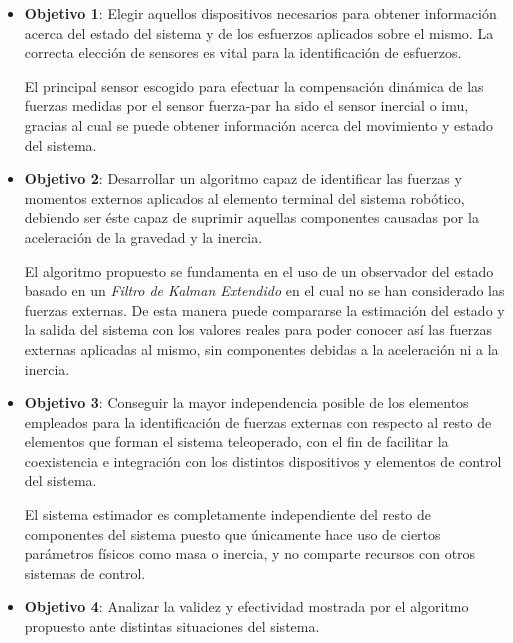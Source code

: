 \begin{itemize}

\item \textbf{Objetivo 1}: Elegir aquellos dispositivos necesarios para obtener información acerca del estado del sistema y de los esfuerzos aplicados sobre el mismo. La correcta elección de sensores es vital para la identificación de esfuerzos. \par 

El principal sensor escogido para efectuar la compensación dinámica de las fuerzas medidas por el sensor fuerza-par ha sido el sensor inercial o \acrshort{imu}, gracias al cual se puede obtener información acerca del movimiento y estado del sistema. \par 

\item \textbf{Objetivo 2}: Desarrollar un algoritmo capaz de identificar las fuerzas y momentos externos aplicados al elemento terminal del sistema robótico, debiendo ser éste capaz de suprimir aquellas componentes causadas por la aceleración de la gravedad y la inercia. \par 

El algoritmo propuesto se fundamenta en el uso de un observador del estado basado en un \emph{Filtro de Kalman Extendido} en el cual no se han considerado las fuerzas externas. De esta manera puede compararse la estimación del estado y la salida del sistema con los valores reales para poder conocer así las fuerzas externas aplicadas al mismo, sin componentes debidas a la aceleración ni a la inercia. \par 

\item \textbf{Objetivo 3}: Conseguir la mayor independencia posible de los elementos empleados para la identificación de fuerzas externas con respecto al resto de elementos que forman el sistema teleoperado, con el fin de facilitar la coexistencia e integración con los distintos dispositivos y elementos de control del sistema. \par 

El sistema estimador es completamente independiente del resto de componentes del sistema puesto que únicamente hace uso de ciertos parámetros físicos como masa o inercia, y no comparte recursos con otros sistemas de control. \par 

\item \textbf{Objetivo 4}: Analizar la validez y efectividad mostrada por el algoritmo propuesto ante distintas situaciones del sistema. \par 


\end{itemize}

